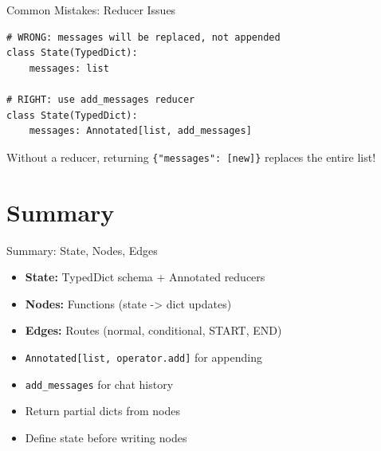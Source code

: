 \documentclass[aspectratio=169,11pt]{beamer}
\begin{document}
\begin{frame}[fragile,t]{Common Mistakes: Reducer Issues}
\vspace{0.1cm}

\begin{warningbox}
\begin{lstlisting}
# WRONG: messages will be replaced, not appended
class State(TypedDict):
    messages: list

# RIGHT: use add_messages reducer
class State(TypedDict):
    messages: Annotated[list, add_messages]
\end{lstlisting}
\end{warningbox}

\vspace{0.15cm}

{\footnotesize Without a reducer, returning \texttt{\{"messages": [new]\}} replaces the entire list!}
\end{frame}

\section{Summary}
\begin{frame}[t,shrink=2]{Summary: State, Nodes, Edges}
\setlength{\itemsep}{0.5pt}
\vspace{0.05cm}

\begin{conceptbox}
\setlength{\itemsep}{1pt}
\begin{itemize}
  \item \textbf{State:} TypedDict schema + Annotated reducers
  \item \textbf{Nodes:} Functions (state -> dict updates)
  \item \textbf{Edges:} Routes (normal, conditional, START, END)
\end{itemize}
\end{conceptbox}

\vspace{0.15cm}

\begin{tipbox}
\setlength{\itemsep}{1pt}
\begin{itemize}
  \item \texttt{Annotated[list, operator.add]} for appending
  \item \texttt{add\_messages} for chat history
  \item Return partial dicts from nodes
  \item Define state before writing nodes
\end{itemize}
\end{tipbox}
\end{frame}
\end{document}
